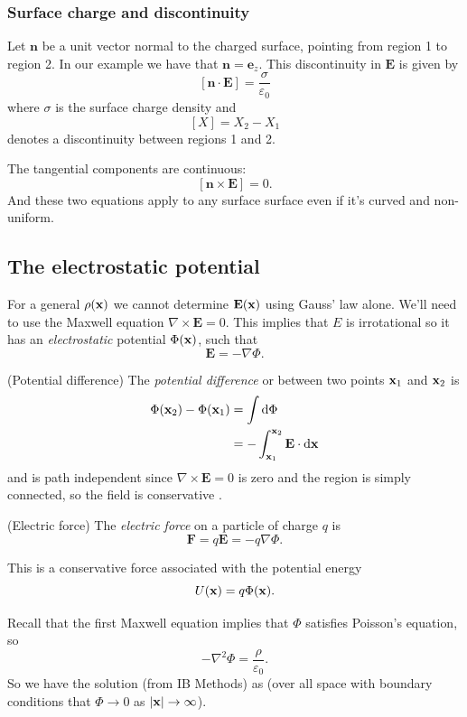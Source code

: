 \documentclass{article}
\begin{document}
\subsubsection{Surface charge and discontinuity}
Let $ \mathbf n $ be a unit vector normal to the charged surface, pointing from region 1 to region 2. In our example we have that $ \mathbf n = \mathbf e_z $. This discontinuity in $ \mathbf E $ is given by
\[
	[\mathbf n\cdot \mathbf E] = \frac\sigma{\varepsilon_0}
\]
where $ \sigma $ is the surface charge density and 
\[
	[X] = X_2-X_1
\]
denotes a discontinuity between regions 1 and 2.\par
The tangential components are continuous:
\[
	[\mathbf n\times \mathbf E]= 0.
\]
And these two equations apply to any surface surface even if it's curved and non-uniform.
\subsection{The electrostatic potential}
For a general $ \rho(\mathbf{x}) $ we cannot determine $ \mathbf E(\mathbf{x}) $ using Gauss' law alone.  We'll need to use the Maxwell equation $ \nabla\times \mathbf E = 0 $. This implies that $ E $ is irrotational so it has an \textit{electrostatic} potential $ \Phi(\mathbf{x}) $, such that
\[
  \mathbf E = - \nabla \Phi.
\]
\begin{definition}
	(Potential difference) The \textit{potential difference} or  between two points $ \mathbf{x}_1 $ and $ \mathbf{x}_2 $ is
	\begin{align*}
		\Phi(\mathbf{x}_2)-\Phi(\mathbf{x}_1) &= \int\mathrm d\Phi \\
				      &= - \int_{\mathbf{x}_1}^{\mathbf{x}_2} \mathbf E\cdot\mathrm d\mathbf{x}
	\end{align*}
	and is path independent since $ \nabla\times \mathbf E = 0 $ is zero and the region is simply connected, so the field is conservative .
\end{definition}
\begin{definition}
	(Electric force) The \textit{electric force} on a particle of charge $ q $ is
	\[
	  \mathbf F = q\mathbf E = -q\nabla\Phi.
	\]
\end{definition}
\begin{remark}
  This is a conservative force associated with the potential energy
  \[
    U(\mathbf{x}) = q\Phi(\mathbf{x}).
  \]
\end{remark}
Recall that the first Maxwell equation implies that $ \Phi $ satisfies Poisson's equation, so
\[
	-\nabla^2 \Phi =\frac\rho{\varepsilon_0}.
\]
So we have the solution (from IB Methods) as (over all space with boundary conditions that $ \Phi \to 0$ as $ |\mathbf{x}|\to\infty $).
\end{document}
